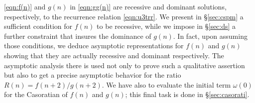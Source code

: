 \documentclass[a4paper,12pt]{article}
\theoremstyle{plain}
\begin{document}
\eqref{eqn:f(n)}  and $g(n)$ in \eqref{eqn:gg(n)} are recessive and dominant 
solutions, respectively,  to the recurrence relation \eqref{eqn:u3trr}.   
We present in \S\ref{sec:cspm} a sufficient condition for $f(n)$ to be recessive,  
while we impose in \S \ref{sec:ds} a further constraint that insures the 
dominance of $g(n)$.  
In fact, upon assuming those conditions, we deduce asymptotic representations 
for $f(n)$ and $g(n)$ showing that they are actually recessive and dominant 
respectively.  
The asymptotic analysis there is used not only to prove such a qualitative 
assertion but also to get a precise asymptotic behavior for the ratio 
$R(n) = f(n+2)/g(n+2)$.  
We have also to evaluate the initial term $\omega(0)$ for the Casoratian  
of $f(n)$ and $g(n)$; this final task is done in \S \ref{sec:casorati}.   
\end{document}
